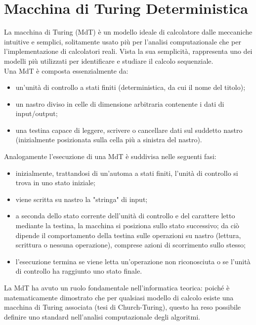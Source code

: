 \chapter{Macchina di Turing Deterministica}
La macchina di Turing (MdT) è un modello ideale di calcolatore dalle meccaniche intuitive e semplici, solitamente usato più per l'analisi computazionale che per l'implementazione di calcolatori reali. Vista la sua semplicità, rappresenta uno dei modelli più utilizzati per identificare e studiare il calcolo sequenziale.\\
Una MdT è composta essenzialmente da:
\begin{itemize}
\item{un'unità di controllo a stati finiti (deterministica, da cui il nome del titolo);}
\item{un nastro diviso in celle di dimensione arbitraria contenente i dati di input/output;}
\item{una testina capace di leggere, scrivere o cancellare dati sul suddetto nastro (inizialmente posizionata sulla cella più a sinistra del nastro).}
\end{itemize}
Analogamente l'esecuzione di una MdT è suddivisa nelle seguenti fasi:
\begin{itemize}
\item{inizialmente, trattandosi di un'automa a stati finiti, l'unità di controllo si trova in uno stato iniziale;}
\item{viene scritta su nastro la "stringa" di input;}
\item{a seconda dello stato corrente dell'unità di controllo e del carattere letto mediante la testina, la macchina si posiziona sullo stato successivo; da ciò dipende il comportamento della testina sulle operazioni su nastro (lettura, scrittura o nessuna operazione), comprese azioni di scorrimento sullo stesso;}
\item{l'esecuzione termina se viene letta un'operazione non riconosciuta o se l'unità di controllo ha raggiunto uno stato finale.}
\end{itemize}
La MdT ha avuto un ruolo fondamentale nell'informatica teorica: poiché è matematicamente dimostrato che per qualsiasi modello di calcolo esiste una macchina di Turing associata (tesi di Church-Turing), questo ha reso possibile definire uno standard nell'analisi computazionale degli algoritmi.
